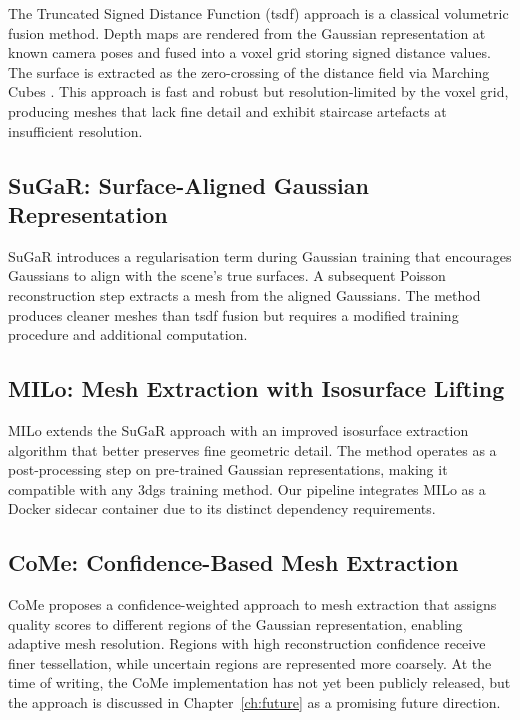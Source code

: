 The Truncated Signed Distance Function (\acrshort{tsdf}) approach \parencite{Curless1996} is a classical volumetric fusion method. Depth maps are rendered from the Gaussian representation at known camera poses and fused into a voxel grid storing signed distance values. The surface is extracted as the zero-crossing of the distance field via Marching Cubes \parencite{Lorensen1987}. This approach is fast and robust but resolution-limited by the voxel grid, producing meshes that lack fine detail and exhibit staircase artefacts at insufficient resolution.

\subsection{SuGaR: Surface-Aligned Gaussian Representation}
\label{sec:tech-sugar}

SuGaR \parencite{Guedon2024Sugar} introduces a regularisation term during Gaussian training that encourages Gaussians to align with the scene's true surfaces. A subsequent Poisson reconstruction step extracts a mesh from the aligned Gaussians. The method produces cleaner meshes than \acrshort{tsdf} fusion but requires a modified training procedure and additional computation.

\subsection{MILo: Mesh Extraction with Isosurface Lifting}
\label{sec:tech-milo}

MILo \parencite{Guedon2025MILo} extends the SuGaR approach with an improved isosurface extraction algorithm that better preserves fine geometric detail. The method operates as a post-processing step on pre-trained Gaussian representations, making it compatible with any \acrshort{3dgs} training method. Our pipeline integrates MILo as a Docker sidecar container due to its distinct dependency requirements.

\subsection{CoMe: Confidence-Based Mesh Extraction}
\label{sec:tech-come}

CoMe \parencite{Radl2025CoMe} proposes a confidence-weighted approach to mesh extraction that assigns quality scores to different regions of the Gaussian representation, enabling adaptive mesh resolution. Regions with high reconstruction confidence receive finer tessellation, while uncertain regions are represented more coarsely. At the time of writing, the CoMe implementation has not yet been publicly released, but the approach is discussed in Chapter~\ref{ch:future} as a promising future direction.

